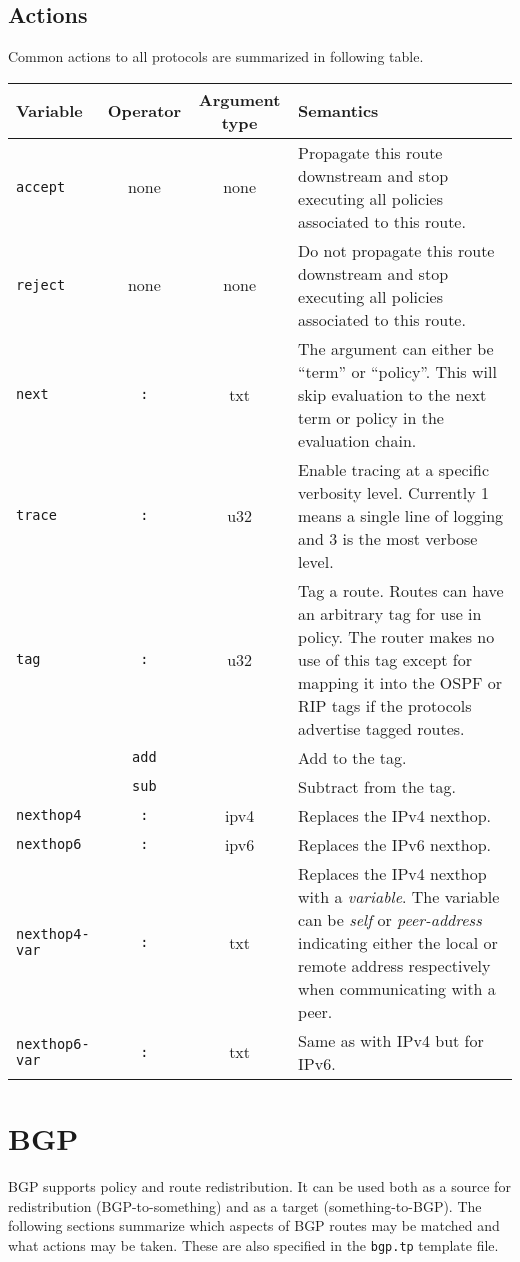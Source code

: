\subsection{Actions}
Common actions to all protocols are summarized in following table.
\begin{center}
\begin{tabular}{|l|c|c|p{7.5cm}|}
\hline
Variable & Operator & Argument type & Semantics \\
\hline\hline
{\tt accept} & none & none & Propagate this route downstream and stop executing
all policies associated to this route.\\
\hline
{\tt reject} & none & none & Do not propagate this route downstream and stop executing
all policies associated to this route.\\
\hline
{\tt next} & {\tt :} & txt & The argument can either be ``term'' or ``policy''.
This will skip evaluation to the next term or policy in the evaluation chain. \\
\hline
{\tt trace} & {\tt :} & u32 & Enable tracing at a specific verbosity level.
Currently 1 means a single line of logging and 3 is the most verbose level. \\
\hline
{\tt tag} & {\tt :} & u32 & Tag a route.  Routes can have an arbitrary tag for
use in policy.  The router makes no use of this tag except for mapping it into
the OSPF or RIP tags if the protocols advertise tagged routes. \\
& {\tt add} & & Add to the tag. \\
& {\tt sub} & & Subtract from the tag. \\
{\tt nexthop4} & {\tt :} & ipv4 & Replaces the IPv4 nexthop. \\
\hline
{\tt nexthop6} & {\tt :} & ipv6 & Replaces the IPv6 nexthop. \\
\hline
{\tt nexthop4-var} & {\tt :} & txt & Replaces the IPv4 nexthop with a {\em
variable}. The variable can be {\em self} or {\em peer-address} indicating
either the local or remote address respectively when communicating with a peer.
\\
\hline
{\tt nexthop6-var} & {\tt :} & txt & Same as with IPv4 but for IPv6. \\
\hline
\end{tabular}
\end{center}

\section{BGP}
BGP supports policy and route redistribution.  It can be used both as a source
for redistribution (BGP-to-something) and as a target (something-to-BGP).  The
following sections summarize which aspects of BGP routes may be matched and what
actions may be taken. These are also specified in the {\tt bgp.tp} template file.

